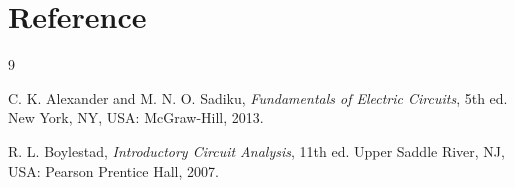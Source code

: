 \documentclass[12pt,a4paper]{article}
\begin{document}
	\section{Reference}
	\begingroup
	\makeatletter
	\def\section{\@ifstar{\@gobble}{\@gobbletwo}}%
	\makeatother
	\begin{thebibliography}{9}
		\itemsep4pt
		
		C. K. Alexander and M. N. O. Sadiku, \textit{Fundamentals of
			Electric Circuits}, 5th ed. New York, NY, USA: McGraw-Hill, 2013.
		
		R. L. Boylestad, \textit{Introductory Circuit Analysis}, 11th ed.
		Upper Saddle River, NJ, USA: Pearson Prentice Hall, 2007.
		
		
	\end{thebibliography}
	\endgroup
	
\end{document}
